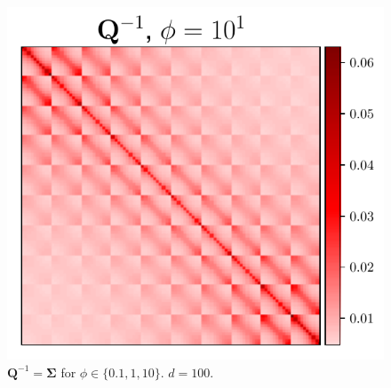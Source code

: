 \documentclass[aspectratio=169]{beamer}
\newcommand{\B}[1]{\mathbf{#1}} %
\begin{document}
\begin{frame}
\begin{figure}
    \mbox{{\includegraphics[scale=0.43]{src/images/simu2_ex1_invA_phi_10.pdf}}}
  \caption{$\B{Q}^{-1}=\B{\Sigma}$ for $\phi \in \{0.1,1,10\}$. $d=100$.}
  \end{figure}
\end{frame}
\end{document}
